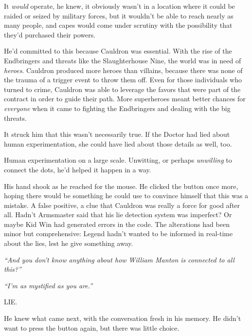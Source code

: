 It \emph{would} operate, he knew, it obviously wasn't in a location where it could be raided or seized by military forces, but it wouldn't be able to reach nearly as many people, and capes would come under scrutiny with the possibility that they'd purchased their powers.



He'd committed to this because Cauldron was essential.  With the rise of the Endbringers and threats like the Slaughterhouse Nine, the world was in need of \emph{heroes}.  Cauldron produced more heroes than villains, because there was none of the trauma of a trigger event to throw them off.  Even for those individuals who turned to crime, Cauldron was able to leverage the favors that were part of the contract in order to guide their path.  More superheroes meant better chances for \emph{everyone} when it came to fighting the Endbringers and dealing with the big threats.



It struck him that this wasn't necessarily true.  If the Doctor had lied about human experimentation, she could have lied about those details as well, too.



Human experimentation on a large scale.  Unwitting, or perhaps \emph{unwilling} to connect the dots, he'd helped it happen in a way.



His hand shook as he reached for the mouse.  He clicked the button once more, hoping there would be something he could use to convince himself that this was a mistake.  A false positive, a clue that Cauldron was really a force for good after all.  Hadn't Armsmaster said that his lie detection system was imperfect?  Or maybe Kid Win had generated errors in the code.  The alterations had been minor but comprehensive:  Legend hadn't wanted to be informed in real-time about the lies, lest he give something away.



\emph{``And you don't know anything about how William Manton is connected to all this?''}



\emph{``I'm as mystified as you are.''}



LIE.



He knew what came next, with the conversation fresh in his memory.  He didn't want to press the button again, but there was little choice.



